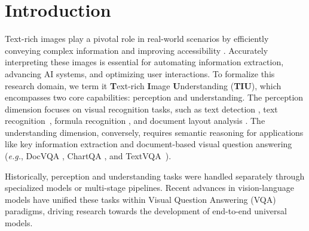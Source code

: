 \section{Introduction}




Text-rich images play a pivotal role in real-world scenarios by efficiently conveying complex information and improving accessibility \cite{biten2019scene}. Accurately interpreting these images is essential for automating information extraction, advancing AI systems, and optimizing user interactions. To formalize this research domain, we term it \textbf{T}ext-rich \textbf{I}mage \textbf{U}nderstanding (\textbf{TIU}), which encompasses two core capabilities: perception and understanding. The perception dimension focuses on visual recognition tasks, such as text detection \cite{liao2022real}, text recognition~\cite{guan2025ccdplus}, formula recognition \cite{TRUONG2024110531, guan2024posformer}, and document layout analysis \cite{Yupan2022ARXIV_LayoutLMv3_Pre_training}. The understanding dimension, conversely, requires semantic reasoning for applications like key information extraction and document-based visual question answering (\emph{e.g.}, DocVQA \cite{mathew2021docvqa}, ChartQA \cite{masry2022chartqa}, and TextVQA~\cite{singh2019towards}).

Historically, perception and understanding tasks were handled separately through specialized models or multi-stage pipelines. Recent advances in vision-language models have unified these tasks within Visual Question Answering (VQA) paradigms, driving research towards the development of end-to-end universal models.


